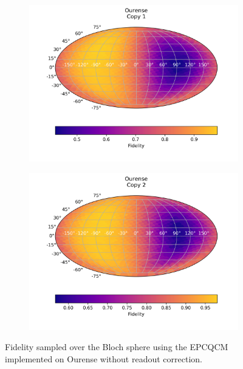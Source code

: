   \begin{figure}[H]
    \centering
    \begin{subfigure}{.5\textwidth}
      \centering
      \includegraphics[width=\textwidth]{Figures/Economical/IBM/FullSphere/results_ourense_copy1.png}
      
      \label{fig:epc_uncorrected_ourense_sphere_1}
    \end{subfigure}%
    \begin{subfigure}{.5\textwidth}
      \centering
      \includegraphics[width=\textwidth]{Figures/Economical/IBM/FullSphere/results_ourense_copy2.png}
      
      \label{fig:epc_uncorrected_ourense_sphere_2}
    \end{subfigure}
    \caption{Fidelity sampled over the Bloch sphere using the EPCQCM implemented on Ourense without readout correction.}
    \label{fig:epc_uncorrected_ourense_sphere}
  \end{figure}
  
